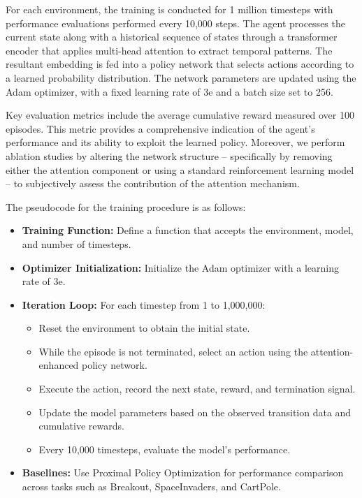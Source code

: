For each environment, the training is conducted for 1 million timesteps with performance evaluations performed every 10,000 steps. The agent processes the current state along with a historical sequence of states through a transformer encoder that applies multi-head attention to extract temporal patterns. The resultant embedding is fed into a policy network that selects actions according to a learned probability distribution. The network parameters are updated using the Adam optimizer, with a fixed learning rate of 3e and a batch size set to 256.

Key evaluation metrics include the average cumulative reward measured over 100 episodes. This metric provides a comprehensive indication of the agent’s performance and its ability to exploit the learned policy. Moreover, we perform ablation studies by altering the network structure – specifically by removing either the attention component or using a standard reinforcement learning model – to subjectively assess the contribution of the attention mechanism.

The pseudocode for the training procedure is as follows:

\begin{itemize}
  \item \textbf{Training Function:} Define a function that accepts the environment, model, and number of timesteps.
  \item \textbf{Optimizer Initialization:} Initialize the Adam optimizer with a learning rate of 3e.
  \item \textbf{Iteration Loop:} For each timestep from 1 to 1,000,000:
    \begin{itemize}
      \item Reset the environment to obtain the initial state.
      \item While the episode is not terminated, select an action using the attention-enhanced policy network.
      \item Execute the action, record the next state, reward, and termination signal.
      \item Update the model parameters based on the observed transition data and cumulative rewards.
      \item Every 10,000 timesteps, evaluate the model’s performance.
    \end{itemize}
  \item \textbf{Baselines:} Use Proximal Policy Optimization \cite{schulman_2017_ppo} for performance comparison across tasks such as Breakout, SpaceInvaders, and CartPole.
\end{itemize}

